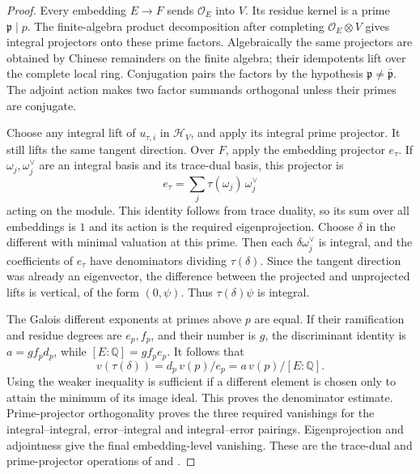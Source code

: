 \begin{proof}
Every embedding \(E\to F\) sends \(\mathcal O_E\) into \(V\).
Its residue kernel is a prime \(\mathfrak p\mid p\).
The finite-algebra product decomposition after completing
\(\mathcal O_E\otimes V\) gives integral projectors onto these prime
factors.  Algebraically the same projectors are obtained by Chinese
remainders on the finite algebra; their idempotents lift over the
complete local ring.
Conjugation pairs the factors by the hypothesis
\(\mathfrak p\ne\bar{\mathfrak p}\).
The adjoint action makes two factor summands orthogonal unless their
primes are conjugate.

Choose any integral lift of \(u_{\tau,i}\) in \(\mathcal H_V\), and
apply its integral prime projector.
It still lifts the same tangent direction.
Over \(F\), apply the embedding projector \(e_\tau\).
If \(\omega_j,\omega_j^\vee\) are an integral basis and its trace-dual
basis, this projector is
\[
                 e_\tau=\sum_j\tau(\omega_j)\,\omega_j^\vee
\]
acting on the module.
This identity follows from trace duality, so its sum over all
embeddings is \(1\) and its action is the required eigenprojection.
Choose \(\delta\) in the different with minimal valuation at this
prime.  Then each \(\delta\omega_j^\vee\) is integral, and the
coefficients of \(e_\tau\) have denominators dividing \(\tau(\delta)\).
Since the tangent direction was already an eigenvector, the
difference between the projected and unprojected lifts is vertical,
of the form \((0,\psi)\).
Thus \(\tau(\delta)\psi\) is integral.

The Galois different exponents at primes above \(p\) are equal.
If their ramification and residue degrees are \(e_p,f_p\), and their
number is \(g\), the discriminant identity is
\(a=gf_p d_p\), while \([E:\mathbb Q]=gf_pe_p\).
It follows that
\[
                  v(\tau(\delta))
                  =d_p\,v(p)/e_p
                  =a\,v(p)/[E:\mathbb Q].
\]
Using the weaker inequality is sufficient if a different element is
chosen only to attain the minimum of its image ideal.
This proves the denominator estimate.
Prime-projector orthogonality proves the three required vanishings
for the integral--integral, error--integral and integral--error
pairings.  Eigenprojection and adjointness give the final
embedding-level vanishing.
These are the trace-dual and prime-projector operations of
 and
.
\end{proof}


